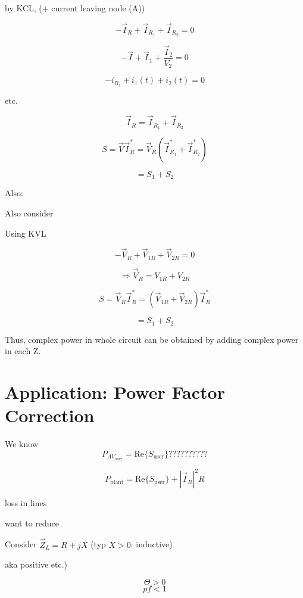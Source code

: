 by KCL, (+ current leaving node (A))

\[
-\vec{I}_R + \vec{I}_{R_1} + \vec{I}_{R_2} = 0
\]


\[
-\vec{I} + \vec{I}_1 + \frac{\vec{I}_2}{V_2} = 0
\]

\[
-i_{R_1} + i_1(t) + i_2(t) = 0
\]

etc.

\[
\vec{I}_R = \vec{I}_{R_1} + \vec{I}_{R_2}
\]

\[
S = \vec{V} \vec{I}_R^* = \vec{V}_R (\vec{I}_{R_1}^* + \vec{I}_{R_2}^*)
\]

\[
= S_1 + S_2
\]

\noindent Also:




\noindent Also consider


Using KVL

\[
-\vec{V}_R + \vec{V}_{1R} + \vec{V}_{2R} = 0
\]

\[
\Rightarrow \vec{V}_R = V_{1R} + V_{2R}
\]

\[
S = \vec{V}_R \vec{I}_R^* = (\vec{V}_{1R} + \vec{V}_{2R}) \vec{I}_R^*
\]

\[
= S_1 + S_2
\]

Thus, complex power in whole circuit can be obtained by adding complex power in each Z.


\newpage
\section{Application: Power Factor Correction}



\noindent We know
\[
P_{AV_{\text{user}}} = \text{Re}\{S_{\text{user}}\} ??????????
\]

\[
P_{\text{plant}} = \text{Re}\{S_{\text{user}}\} + |\vec{I}_R|^2 R
\]

\hspace{5cm} loss in lines

\hspace{5cm} want to reduce

\noindent Consider $\vec{Z}_L = R + jX$ (typ $X > 0$: inductive)

aka positive etc.)

\[
\Theta > 0
\]
\[
pf < 1
\]

